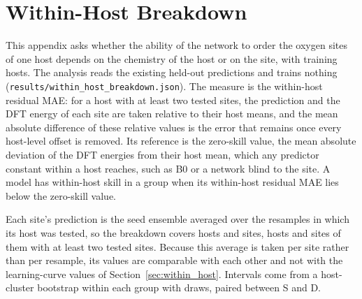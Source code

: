 \section{Within-Host Breakdown}
\label{app:within}

This appendix asks whether the ability of the network to order the oxygen sites of one host depends on the chemistry of the host or on the site, with \numWithinHostBreakdownBudget{} training hosts. The analysis reads the existing held-out predictions and trains nothing (\texttt{results/within\_host\_breakdown.json}). The measure is the within-host residual MAE: for a host with at least two tested sites, the prediction and the DFT energy of each site are taken relative to their host means, and the mean absolute difference of these relative values is the error that remains once every host-level offset is removed. Its reference is the zero-skill value, the mean absolute deviation of the DFT energies from their host mean, which any predictor constant within a host reaches, such as B0 or a network blind to the site. A model has within-host skill in a group when its within-host residual MAE lies below the zero-skill value.

Each site's prediction is the seed ensemble averaged over the resamples in which its host was tested, so the breakdown covers \numWithinHostBreakdownGroupsPooledAllNHosts{} hosts and \numWithinHostBreakdownGroupsPooledAllNSites{} sites, \numNetWithinHosts{} hosts and \numNetWithinSites{} sites of them with at least two tested sites. Because this average is taken per site rather than per resample, its values are comparable with each other and not with the learning-curve values of Section~\ref{sec:within_host}. Intervals come from a host-cluster bootstrap within each group with \numWithinHostBreakdownBootstrapDraws{} draws, paired between S and D.

